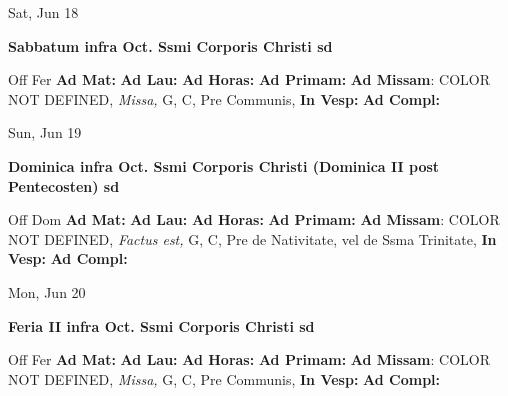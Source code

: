 \documentclass[10pt]{book}
\begin{document}
\begin{center}
\begin{minipage}{3.5in}
\vspace{2em}
\begin{center}Sat, Jun 18
\end{center}
\textbf{ \large Sabbatum infra Oct. Ssmi Corporis Christi
\textnormal{\normalsize sd}}

\begin{justify}Off Fer
\textbf{Ad Mat: }
\textbf{Ad Lau: }
\textbf{Ad Horas: }
\textbf{Ad Primam: }\textbf{Ad Missam}: COLOR NOT DEFINED, \textit{Missa,} G, C, Pre Communis, 
\textbf{In Vesp: }
\textbf{Ad Compl: }
\end{justify}
\end{minipage}
\end{center}

\begin{center}
\begin{minipage}{3.5in}
\vspace{2em}
\begin{center}Sun, Jun 19
\end{center}
\textbf{ \large Dominica infra Oct. Ssmi Corporis Christi (Dominica II post Pentecosten)
\textnormal{\normalsize sd}}

\begin{justify}Off Dom
\textbf{Ad Mat: }
\textbf{Ad Lau: }
\textbf{Ad Horas: }
\textbf{Ad Primam: }\textbf{Ad Missam}: COLOR NOT DEFINED, \textit{Factus est,} G, C, Pre de Nativitate, vel de Ssma Trinitate, 
\textbf{In Vesp: }
\textbf{Ad Compl: }
\end{justify}
\end{minipage}
\end{center}

\begin{center}
\begin{minipage}{3.5in}
\vspace{2em}
\begin{center}Mon, Jun 20
\end{center}
\textbf{ \large Feria II infra Oct. Ssmi Corporis Christi
\textnormal{\normalsize sd}}

\begin{justify}Off Fer
\textbf{Ad Mat: }
\textbf{Ad Lau: }
\textbf{Ad Horas: }
\textbf{Ad Primam: }\textbf{Ad Missam}: COLOR NOT DEFINED, \textit{Missa,} G, C, Pre Communis, 
\textbf{In Vesp: }
\textbf{Ad Compl: }
\end{justify}
\end{minipage}
\end{center}
\end{document}
